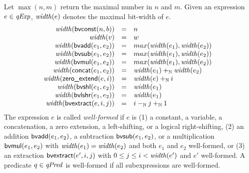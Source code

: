 Let $\max(n, m)$ return the maximal number in $n$ and $m$.
Given an expression $e \in \mathit{qExp}$, $\mathit{width}(e)$ denotes the maximal bit-width of $e$.
\[
\begin{array}{rcl}
\mathit{width}(\mbox{\textsf{bvconst}}(n, b)) & = & n \\
\mathit{width}(v) & = & w \\
\mathit{width}(\mbox{\textsf{bvadd}}(e_1, e_2)) & = & max(\mathit{width}(e_1), \mathit{width}(e_2))\\
\mathit{width}(\mbox{\textsf{bvsub}}(e_1, e_2)) & = & max(\mathit{width}(e_1), \mathit{width}(e_2))\\
\mathit{width}(\mbox{\textsf{bvmul}}(e_1, e_2)) & = & max(\mathit{width}(e_1), \mathit{width}(e_2))\\
\mathit{width}(\mbox{\textsf{concat}}(e_1, e_2)) & = & \mathit{width}(e_1) +_{\mathbb{N}} \mathit{width}(e_2)\\
\mathit{width}(\mbox{\textsf{zero\_extend}}(e, i)) & = & \mathit{width}(e) +_{\mathbb{N}} i \\
\mathit{width}(\mbox{\textsf{bvshl}}(e_1, e_2)) & = & \mathit{width}(e_1) \\
\mathit{width}(\mbox{\textsf{bvlshr}}(e_1, e_2)) & = & \mathit{width}(e_1) \\
\mathit{width}(\mbox{\textsf{bvextract}}(e, i, j)) & = & i -_{\mathbb{N}} j +_{\mathbb{N}} 1 \\
\end{array}
\]
The expression $e$ is called \emph{well-formed} if $e$ is (1) a constant, a variable, a concatenation, a zero extension, a left-shifting, or a logical right-shifting, (2) an addition $\mbox{\textsf{bvadd}}(e_1, e_2)$, a subtraction $\mbox{\textsf{bvsub}}(e_1, e_2)$, or a multiplication $\mbox{\textsf{bvmul}}(e_1, e_2)$ with $\mathit{width}(e_1) = \mathit{width}(e_2)$ and both $e_1$ and $e_2$ well-formed, or (3) an extraction $\mbox{\textsf{bvextract}}(e', i, j)$ with $0 \leq j \leq i < \mathit{width}(e')$ and $e'$ well-formed.
A predicate $q \in \mathit{qPred}$ is well-formed if all subexpressions are well-formed.

